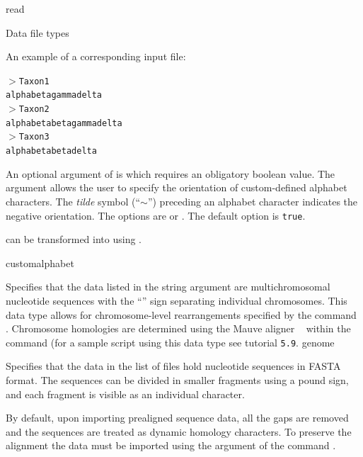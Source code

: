 \begin{command}{read}{}
\begin{arguments}
\begin{argumentgroup}{Data file types}
{           An example of a corresponding input file:
       
           \texttt{$>$Taxon1\\
	alphabetagammadelta\\
	$>$Taxon2\\
	alphabetabetagammadelta\\
	$>$Taxon3\\
	alphabetabetadelta}
	
	An optional argument of  is 
	which requires an obligatory boolean value. The argument
	 allows the user to specify the orientation of custom-defined alphabet
	characters. The \emph{tilde} symbol (``$\sim$'') preceding an alphabet character indicates
	the negative orientation. The options are 
	or . The default option is \texttt{true}.
	
	can be transformed into  using .}
	 {customalphabet}
        
            {Specifies that the data listed in the string argument are
            multichromosomal nucleotide sequences with the ``\atsymbol'' sign 
            separating individual chromosomes. This data type
            allows for chromosome-level rearrangements specified by
           the command . Chromosome
            homologies are determined using the Mauve aligner ~\cite{darlingetal2004} within 	 	
            the command 
            (for a sample script using this data type see tutorial \texttt{5.9}.} 
            {genome}
            
            {Specifies that the data in the list of files hold nucleotide
            sequences in FASTA format. The sequences can be divided in smaller
            fragments using a pound sign, and each fragment is visible as an
            individual character.} 
            {}

          \begin{statement}
            By default, upon importing prealigned sequence data, all the gaps are
             removed and the sequences are treated as dynamic homology characters.
             To preserve the alignment the data must be imported using the
              argument of the command .
          \end{statement}
        

\end{argumentgroup}
\end{arguments}
\end{command}
